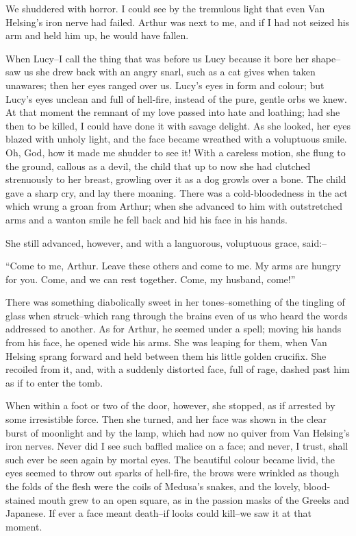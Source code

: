 \documentclass[12pt,openright]{book}
\begin{document}
We shuddered with horror. I could see by the tremulous light that even Van Helsing’s iron nerve had failed. Arthur was next to me, and if I had not seized his arm and held him up, he would have fallen.

When Lucy–I call the thing that was before us Lucy because it bore her shape–saw us she drew back with an angry snarl, such as a cat gives when taken unawares; then her eyes ranged over us. Lucy’s eyes in form and colour; but Lucy’s eyes unclean and full of hell-fire, instead of the pure, gentle orbs we knew. At that moment the remnant of my love passed into hate and loathing; had she then to be killed, I could have done it with savage delight. As she looked, her eyes blazed with unholy light, and the face became wreathed with a voluptuous smile. Oh, God, how it made me shudder to see it! With a careless motion, she flung to the ground, callous as a devil, the child that up to now she had clutched strenuously to her breast, growling over it as a dog growls over a bone. The child gave a sharp cry, and lay there moaning. There was a cold-bloodedness in the act which wrung a groan from Arthur; when she advanced to him with outstretched arms and a wanton smile he fell back and hid his face in his hands.

She still advanced, however, and with a languorous, voluptuous grace, said:–

“Come to me, Arthur. Leave these others and come to me. My arms are hungry for you. Come, and we can rest together. Come, my husband, come!”

There was something diabolically sweet in her tones–something of the tingling of glass when struck–which rang through the brains even of us who heard the words addressed to another. As for Arthur, he seemed under a spell; moving his hands from his face, he opened wide his arms. She was leaping for them, when Van Helsing sprang forward and held between them his little golden crucifix. She recoiled from it, and, with a suddenly distorted face, full of rage, dashed past him as if to enter the tomb.

When within a foot or two of the door, however, she stopped, as if arrested by some irresistible force. Then she turned, and her face was shown in the clear burst of moonlight and by the lamp, which had now no quiver from Van Helsing’s iron nerves. Never did I see such baffled malice on a face; and never, I trust, shall such ever be seen again by mortal eyes. The beautiful colour became livid, the eyes seemed to throw out sparks of hell-fire, the brows were wrinkled as though the folds of the flesh were the coils of Medusa’s snakes, and the lovely, blood-stained mouth grew to an open square, as in the passion masks of the Greeks and Japanese. If ever a face meant death–if looks could kill–we saw it at that moment.
\end{document}
